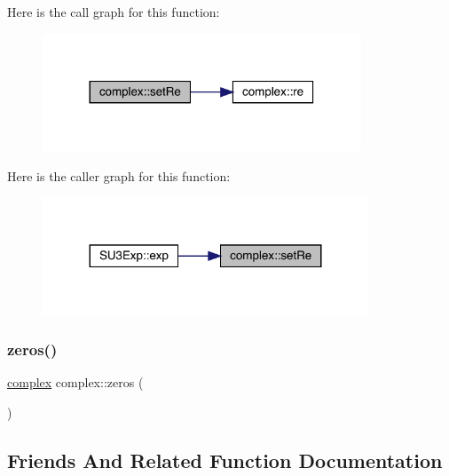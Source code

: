Here is the call graph for this function\+:\nopagebreak
\begin{figure}[H]
\begin{center}
\leavevmode
\includegraphics[width=269pt]{classcomplex_a360f0c3963a8e654ccbc16712294f4d7_cgraph}
\end{center}
\end{figure}
Here is the caller graph for this function\+:\nopagebreak
\begin{figure}[H]
\begin{center}
\leavevmode
\includegraphics[width=275pt]{classcomplex_a360f0c3963a8e654ccbc16712294f4d7_icgraph}
\end{center}
\end{figure}
\mbox{\label{classcomplex_ab1009ede7230f86df1a13f9c5c258ac7}} 
\subsubsection{\texorpdfstring{zeros()}{zeros()}}
{\footnotesize\ttfamily \mbox{\hyperlink{classcomplex}{complex}} complex\+::zeros (\begin{DoxyParamCaption}{ }\end{DoxyParamCaption})}



\subsection{Friends And Related Function Documentation}
\mbox{\label{classcomplex_aad6a59c1e6f7a869a693e1eba8b2604d}} 
